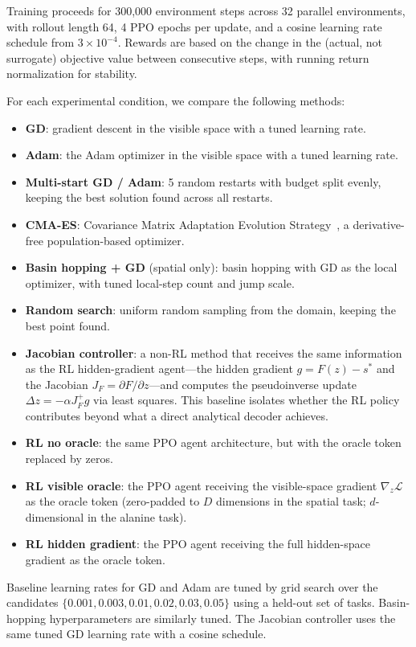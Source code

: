 \documentclass[10pt]{article}
\theoremstyle{definition}
\begin{document}
Training proceeds for 300{,}000 environment steps across 32 parallel environments, with rollout length 64, 4 PPO epochs per update, and a cosine learning rate schedule from $3 \times 10^{-4}$. Rewards are based on the change in the (actual, not surrogate) objective value between consecutive steps, with running return normalization for stability.

For each experimental condition, we compare the following methods:
\begin{itemize}
    \item \textbf{GD}: gradient descent in the visible space with a tuned learning rate.
    \item \textbf{Adam}: the Adam optimizer in the visible space with a tuned learning rate.
    \item \textbf{Multi-start GD / Adam}: 5 random restarts with budget split evenly, keeping the best solution found across all restarts.
    \item \textbf{CMA-ES}: Covariance Matrix Adaptation Evolution Strategy~\citep{hansen2003reducing}, a derivative-free population-based optimizer.
    \item \textbf{Basin hopping + GD} (spatial only): basin hopping with GD as the local optimizer, with tuned local-step count and jump scale.
    \item \textbf{Random search}: uniform random sampling from the domain, keeping the best point found.
    \item \textbf{Jacobian controller}: a non-RL method that receives the same information as the RL hidden-gradient agent---the hidden gradient $g = F(z) - s^*$ and the Jacobian $J_F = \partial F / \partial z$---and computes the pseudoinverse update $\Delta z = -\alpha J_F^+ g$ via least squares. This baseline isolates whether the RL policy contributes beyond what a direct analytical decoder achieves.
    \item \textbf{RL no oracle}: the same PPO agent architecture, but with the oracle token replaced by zeros.
    \item \textbf{RL visible oracle}: the PPO agent receiving the visible-space gradient $\nabla_z \mathcal{L}$ as the oracle token (zero-padded to $D$ dimensions in the spatial task; $d$-dimensional in the alanine task).
    \item \textbf{RL hidden gradient}: the PPO agent receiving the full hidden-space gradient as the oracle token.
\end{itemize}
Baseline learning rates for GD and Adam are tuned by grid search over the candidates $\{0.001, 0.003, 0.01, 0.02, 0.03, 0.05\}$ using a held-out set of tasks. Basin-hopping hyperparameters are similarly tuned. The Jacobian controller uses the same tuned GD learning rate with a cosine schedule.
\end{document}
